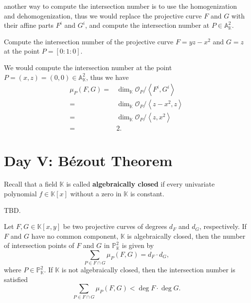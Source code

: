 \documentclass[10pt]{article}
\begin{document}
another way to compute the intersection number is to use the homogenization and dehomogenization, thus we would replace the projective curve $ F$ and $ G$ with their affine parts $ F^{i}$ and $ G^{i}$, and compute the intersection number at $ P \in \mathbb{A}^{2}_{\mathbb{K}}$.
\begin{example}
  Compute the intersection number of the projective curve $ F = yz - x^{2}$ and $ G = z$ at the point $ P = [0:1:0]$.
\end{example}
\begin{solution}
  We would compute the intersection number at the point $ P = (x,z) = (0,0) \in \mathbb{A}_{\mathbb{K}}^{2}$, thus we have
  \begin{equation*}
    \begin{aligned}
      \mu_{P}(F,G) = & \dim_{\mathbb{K}} \mathcal{O}_{P} / \left< F^{i}, G^{i} \right>\\
      = & \dim_{\mathbb{K}} \mathcal{O}_{P} / \left< z - x^{2}, z \right>\\
      = & \dim_{\mathbb{K}} \mathcal{O}_{P} / \left< z, x^{2} \right>\\
      = & 2.
    \end{aligned}
  \end{equation*}
\end{solution}

\section{Day V: B\'ezout Theorem}

Recall that a field $ \mathbb{K}$ is called \textbf{algebraically closed} if every univariate polynomial $f \in \mathbb{K}[x]$ without a zero in $\mathbb{K}$ is constant.

\begin{theorem}
  TBD.
\end{theorem}

\begin{theorem}
  Let $ F, G \in \mathbb{K}[x,y]$ be two projective curves of degrees $ d_F$ and $ d_G$, respectively. If $ F$ and $ G$ have no common component, $ \mathbb{K}$ is algebraically closed, then the number of intersection points of $ F$ and $ G$ in $\mathbb{P}^2_{\mathbb{K}}$ is given by
  \begin{equation*}
    \sum_{P \in F \cap G} \mu_{P}(F,G) = d_F \cdot d_G,
  \end{equation*}
  where $ P \in \mathbb{P}^{2}_{\mathbb{K}}$. If $ \mathbb{K}$ is not algebraically closed, then the intersection number is satisfied
  \begin{equation*}
    \sum_{P \in F \cap G} \mu_{P}(F,G) < \deg F \cdot \deg G.
  \end{equation*}
\end{theorem}
\end{document}
